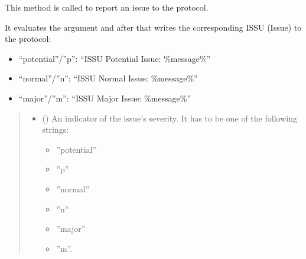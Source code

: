 \documentclass[letterpaper,10pt,english]{sphinxmanual}
\begin{document}
\begin{fulllineitems}
\begin{fulllineitems}
\label{\detokenize{autoapi/aop/aop/index:aop.aop.Session.issue}}
\pysigstartsignatures
{}
\pysigstopsignatures
\sphinxAtStartPar
This method is called to report an issue to the protocol.

\sphinxAtStartPar
It evaluates the  argument and after that writes the
corresponding ISSU (Issue) to the protocol:
\begin{itemize}
\item {} 
\sphinxAtStartPar
“potential”/”p”: “ISSU Potential Issue: \%message\%”

\item {} 
\sphinxAtStartPar
“normal”/”n”: “ISSU Normal Issue: \%message\%”

\item {} 
\sphinxAtStartPar
“major”/”m”: “ISSU Major Issue: \%message\%”

\end{itemize}
\begin{quote}\begin{description}
\begin{itemize}
\item {} 
\sphinxAtStartPar
{} () \textendash{} 
\sphinxAtStartPar
An indicator of the issue’s severity. It has to be one of the
following strings:
\begin{itemize}
\item {} 
\sphinxAtStartPar
”potential”

\item {} 
\sphinxAtStartPar
”p”

\item {} 
\sphinxAtStartPar
”normal”

\item {} 
\sphinxAtStartPar
”n”

\item {} 
\sphinxAtStartPar
”major”

\item {} 
\sphinxAtStartPar
”m”.


\end{itemize}
\end{itemize}
\end{description}
\end{quote}
\end{fulllineitems}
\end{fulllineitems}
\end{document}
